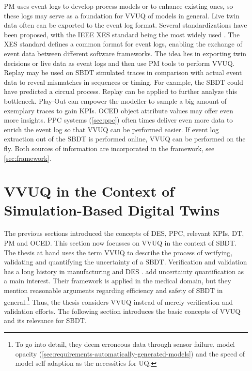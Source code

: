 PM uses event logs to develop process models or to enhance existing ones, so these logs may serve as a foundation for VVUQ of models in general. Live twin data often can be exported to the event log format. Several standardizations have been proposed, with the IEEE XES standard being the most widely used \autocite{van2016data}. The XES standard defines a common format for event logs, enabling the exchange of event data between different software frameworks. The idea lies in exporting twin decisions or live data as event logs and then use PM tools to perform VVUQ.
Replay may be used on SBDT simulated traces in comparison with actual event data to reveal mismatches in sequences or timing. For example, the SBDT could have predicted a circual process. Replay can be applied to further analyze this bottleneck. Play-Out can empower the modeller to sample a big amount of exemplary traces to gain KPIs. OCED object attribute values may offer even more insights.
PPC systems (\autoref{sec:ppc}) often times deliver even more data to enrich the event log so that VVUQ can be performed easier. If event log extraction out of the SBDT is performed online, VVUQ can be performed on the fly. Both sources of information are incorporated in the framework, see \autoref{sec:framework}.

\section{VVUQ in the Context of Simulation-Based Digital Twins}
\label{sec:vvuq-sbdt}

The previous sections introduced the concepts of DES, PPC, relevant KPIs, DT, PM and OCED. This section now focusses on VVUQ in the context of SBDT. The thesis at hand uses the term VVUQ to describe the process of verifying, validating and quantifying the uncertainty of a SBDT. Verification and validation has a long history in manufacturing and DES \autocite{Bitencourt2023}. \Autocite{sel2025survey} add uncertainty quantification as a main interest. Their framework is applied in the medical domain, but they mention reasonable arguments regarding efficiency and safety of SBDT in general.\footnote{To go into detail, they deem erroneous data through sensor failure, model opacity (\autoref{sec:requirements-automatically-generated-models}) and the speed of model self-adaption as the necessities for UQ.} Thus, the thesis considers VVUQ instead of merely verification and validation efforts. The following section introduces the basic concepts of VVUQ and its relevance for SBDT.


